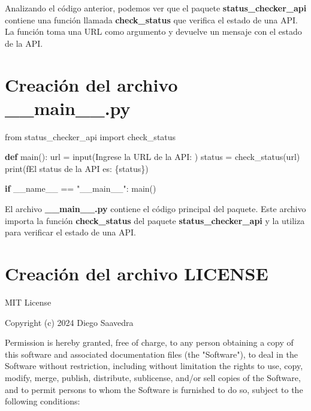 \documentclass[
  a4paper,
  DIV=11,
  numbers=noendperiod,
  onepage,
  openany]{scrreprt}
\newenvironment{Shaded}{\begin{snugshade}}{\end{snugshade}}
\newcommand{\BuiltInTok}[1]{\textcolor[rgb]{0.00,0.23,0.31}{#1}}
\newcommand{\ControlFlowTok}[1]{\textcolor[rgb]{0.00,0.23,0.31}{\textbf{#1}}}
\newcommand{\ImportTok}[1]{\textcolor[rgb]{0.00,0.46,0.62}{#1}}
\newcommand{\KeywordTok}[1]{\textcolor[rgb]{0.00,0.23,0.31}{\textbf{#1}}}
\newcommand{\NormalTok}[1]{\textcolor[rgb]{0.00,0.23,0.31}{#1}}
\newcommand{\OperatorTok}[1]{\textcolor[rgb]{0.37,0.37,0.37}{#1}}
\newcommand{\SpecialCharTok}[1]{\textcolor[rgb]{0.37,0.37,0.37}{#1}}
\newcommand{\SpecialStringTok}[1]{\textcolor[rgb]{0.13,0.47,0.30}{#1}}
\newcommand{\StringTok}[1]{\textcolor[rgb]{0.13,0.47,0.30}{#1}}
\newcommand{\VariableTok}[1]{\textcolor[rgb]{0.07,0.07,0.07}{#1}}
\begin{document}
\begin{tcolorbox}
Analizando el código anterior, podemos ver que el paquete
\textbf{status\_checker\_api} contiene una función llamada
\textbf{check\_status} que verifica el estado de una API. La función
toma una URL como argumento y devuelve un mensaje con el estado de la
API.

\chapter{Creación del archivo
\_\_main\_\_.py}\label{creaciuxf3n-del-archivo-__main__.py}

\begin{Shaded}
\begin{Highlighting}[]
\ImportTok{from}\NormalTok{ status\_checker\_api }\ImportTok{import}\NormalTok{ check\_status}

\KeywordTok{def}\NormalTok{ main():}
\NormalTok{    url }\OperatorTok{=} \BuiltInTok{input}\NormalTok{(}\StringTok{\textquotesingle{}Ingrese la URL de la API: \textquotesingle{}}\NormalTok{)}
\NormalTok{    status }\OperatorTok{=}\NormalTok{ check\_status(url)}
    \BuiltInTok{print}\NormalTok{(}\SpecialStringTok{f\textquotesingle{}El status de la API es: }\SpecialCharTok{\{}\NormalTok{status}\SpecialCharTok{\}}\SpecialStringTok{\textquotesingle{}}\NormalTok{)}

\ControlFlowTok{if} \VariableTok{\_\_name\_\_} \OperatorTok{==} \StringTok{"\_\_main\_\_"}\NormalTok{:}
\NormalTok{    main()}
\end{Highlighting}
\end{Shaded}

El archivo \textbf{\_\_main\_\_.py} contiene el código principal del
paquete. Este archivo importa la función \textbf{check\_status} del
paquete \textbf{status\_checker\_api} y la utiliza para verificar el
estado de una API.

\chapter{Creación del archivo
LICENSE}\label{creaciuxf3n-del-archivo-license}

\begin{Shaded}
\begin{Highlighting}[]
\NormalTok{MIT License}

\NormalTok{Copyright (c) 2024 Diego Saavedra}

\NormalTok{Permission is hereby granted, free of charge, to any person obtaining a copy}
\NormalTok{of this software and associated documentation files (the "Software"), to deal}
\NormalTok{in the Software without restriction, including without limitation the rights}
\NormalTok{to use, copy, modify, merge, publish, distribute, sublicense, and/or sell}
\NormalTok{copies of the Software, and to permit persons to whom the Software is}
\NormalTok{furnished to do so, subject to the following conditions:}


\end{Highlighting}
\end{Shaded}
\end{tcolorbox}
\end{document}
